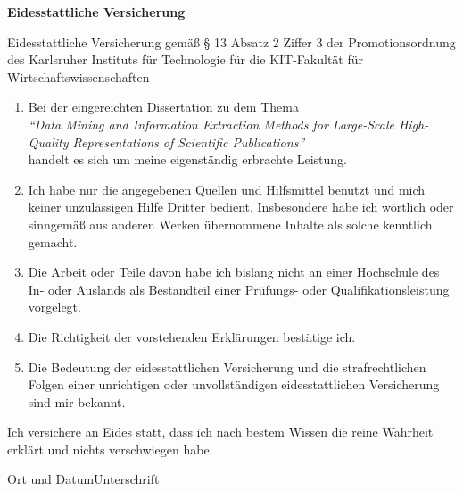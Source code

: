 \thispagestyle{empty}

\begin{center}
\Large{\textbf{Eidesstattliche Versicherung}}
\end{center}

Eidesstattliche Versicherung gemäß § 13 Absatz 2 Ziffer 3 der Promotionsordnung des Karlsruher Instituts für Technologie für die KIT-Fakultät für Wirtschaftswissenschaften

\begin{enumerate}

\item Bei der eingereichten Dissertation zu dem Thema\\
\emph{``Data Mining and Information Extraction Methods for Large-Scale High-Quality Representations of Scientific Publications''}\\
handelt es sich um meine eigenständig erbrachte Leistung.

\item Ich habe nur die angegebenen Quellen und Hilfsmittel benutzt und mich keiner unzulässigen Hilfe Dritter bedient. Insbesondere habe ich wörtlich oder sinngemäß aus anderen Werken übernommene Inhalte als solche kenntlich gemacht.

\item Die Arbeit oder Teile davon habe ich bislang nicht an einer Hochschule des In- oder Auslands als Bestandteil einer Prüfungs- oder Qualifikationsleistung vorgelegt.

\item Die Richtigkeit der vorstehenden Erklärungen bestätige ich.

\item Die Bedeutung der eidesstattlichen Versicherung und die strafrechtlichen Folgen einer unrichtigen oder unvollständigen eidesstattlichen Versicherung sind mir bekannt.
\end{enumerate}

Ich versichere an Eides statt, dass ich nach bestem Wissen die reine Wahrheit erklärt und nichts verschwiegen habe.\\\vspace{3em}

Ort und Datum\hfill Unterschrift
